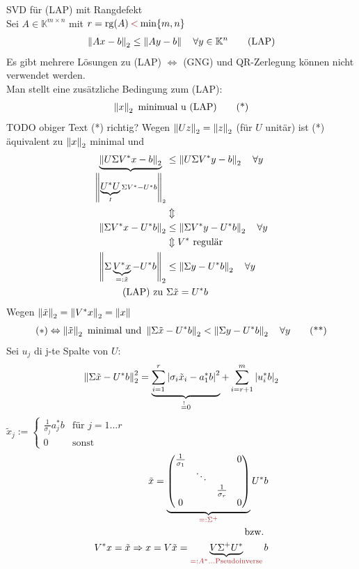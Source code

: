 SVD für (LAP) mit Rangdefekt\\
Sei $A \in \mathbb{K}^{m \times n}$ mit $r = \mathrm{rg}(A) \mathbin{\textcolor{rot}{<}} \min \{m,n\}$
\begin{align*}
  \left\lVert Ax - b \right\rVert_2 \leq \left\lVert Ay - b \right\rVert \quad \forall y \in \mathbb{K}^n \tag{LAP}
\end{align*}
Es gibt mehrere Lösungen zu (LAP) $\Leftrightarrow$ (GNG) und QR-Zerlegung können nicht verwendet werden.\\
Man stellt eine zusätzliche Bedingung zum (LAP):
\begin{align*}
  \left\lVert x \right\rVert_2 \text{ minimual u (LAP)} \tag{*}
\end{align*}
TODO obiger Text (*) richtig?
Wegen $\left\lVert Uz \right\rVert_2 = \left\lVert z \right\rVert_2$ (für $U$ unitär) ist (*) äquivalent zu $\left\lVert x \right\rVert_2$ minimal und
\begin{align*}
  \underbrace{\left\lVert U \Sigma  V^* x - b \right\rVert_2}_{\left\lVert \underbrace{U^*U}_I \Sigma V^* - U^* b \right\rVert_2} &\leq \left\lVert U \Sigma V^* y - b \right\rVert_2 \quad \forall y\\
  &\Updownarrow\\
  \left\lVert \Sigma V^* x - U^*b \right\rVert_2 &\leq \left\lVert \Sigma V^* y - U^* b \right\rVert_2 \quad \forall y\\
  &\Updownarrow V^* \text{ regulär}\\
  \left\lVert \Sigma \underbrace{V^*x}_{=: \tilde{x}} - U^*b \right\rVert_2 &\leq \left\lVert \Sigma y - U^*b \right\rVert_2 \quad \forall y \\
  \text{(LAP) zu } &\Sigma \tilde{x} = U^*b
\end{align*}
Wegen $\left\lVert \tilde{x} \right\rVert_2 = \left\lVert V^* x \right\rVert_2 = \left\lVert x \right\rVert$
\begin{align*}
  (*) \Leftrightarrow \left\lVert \tilde{x} \right\rVert_2 \text{ minimal und } \left\lVert \Sigma \tilde{x} - U^* b \right\rVert_2 < \left\lVert \Sigma y - U^*b \right\rVert_2 \quad \forall y \tag{**}
\end{align*}
Sei $u_j$ di j-te Spalte von $U$:
\begin{align*}
  \left\lVert \Sigma \tilde{x} - U^*b \right\rVert_2^2 = \underbrace{\sum^{r}_{i=1} \left| \sigma_i \tilde{x}_i - a_1^* b \right|^2}_{\overset{!}{=} 0} + \sum^{m}_{i=r+1} \left| u_i^* b \right|_2
\end{align*}
 $\tilde{x}_j := \begin{cases}
    \frac{1}{\sigma_j} a_j^*b &\mbox{für } j =1\ldots r\\
     0 &\mbox{sonst}
  \end{cases}$
\begin{align*}
  \tilde{x} = \underbrace{\begin{pmatrix}
        \frac{1}{\sigma_1} &        &          & 0 \\
                 & \ddots &          &   \\
                 &        & \frac{1}{\sigma_r} &   \\
        0        &        &          & 0
      \end{pmatrix}}_{\textcolor{rot}{=: \Sigma^+}} U^*b \\
  \text{ bzw. } \\
  V^* x = \tilde{x} \Rightarrow x = V\tilde{x} = \underbrace{V\Sigma^+U^*}_{\textcolor{rot}{=: A^*\ldots\text{Pseudoinverse}}}b
\end{align*}
